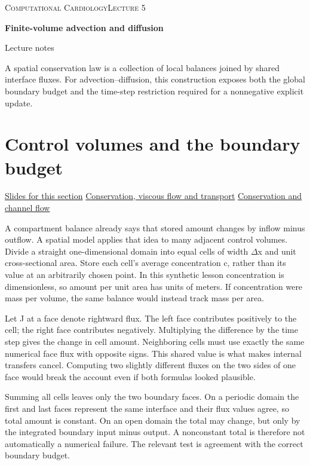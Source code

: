 \documentclass[11pt,letterpaper]{article}
\theoremstyle{definition}\newtheorem{definition}{Definition}\newtheorem{example}{Example}
\numberwithin{equation}{section}
\begin{document}
{\small\scshape Computational Cardiology\hfill Lecture 5}\par\medskip
{\raggedright{}\LARGE\bfseries\color{ink} Finite-volume advection and diffusion\par}\medskip
{\small Lecture notes}\par\bigskip
A spatial conservation law is a collection of local balances joined by shared interface fluxes. For advection--diffusion, this construction exposes both the global boundary budget and the time-step restriction required for a nonnegative explicit update.

\section{Control volumes and the boundary budget}
\hypertarget{note-control-volumes-and-the-boundary-budget}{}\label{note:control-volumes-and-the-boundary-budget}
{\small \href{slides.html\#frame=the-represented-concentration\&step=1}{Slides for this section} \quad \href{../modules/cfd/index.html}{Conservation, viscous flow and transport} \quad \href{../modules/animations/conservation-flow.html}{Conservation and channel flow}}\par
A compartment balance already says that stored amount changes by inflow minus outflow. A spatial model applies that idea to many adjacent control volumes. Divide a straight one-dimensional domain into equal cells of width \ensuremath{\Delta}x and unit cross-sectional area. Store each cell's average concentration c, rather than its value at an arbitrarily chosen point. In this synthetic lesson concentration is dimensionless, so amount per unit area has units of meters. If concentration were mass per volume, the same balance would instead track mass per area.

Let J at a face denote rightward flux. The left face contributes positively to the cell; the right face contributes negatively. Multiplying the difference by the time step gives the change in cell amount. Neighboring cells must use exactly the same numerical face flux with opposite signs. This shared value is what makes internal transfers cancel. Computing two slightly different fluxes on the two sides of one face would break the account even if both formulas looked plausible.

Summing all cells leaves only the two boundary faces. On a periodic domain the first and last faces represent the same interface and their flux values agree, so total amount is constant. On an open domain the total may change, but only by the integrated boundary input minus output. A nonconstant total is therefore not automatically a numerical failure. The relevant test is agreement with the correct boundary budget.
\end{document}
